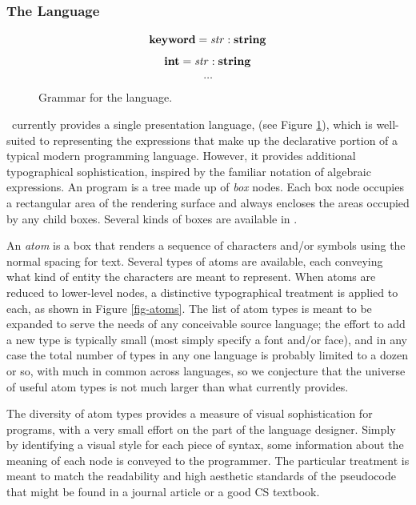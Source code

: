 
\subsubsection{The  Language}

\begin{figure}
$$\textbf{keyword} = \mathit{str} : \textbf{string}$$
$$\textbf{int} = \mathit{str} : \textbf{string}$$
$$\dots$$
\caption{\label{fig-expr} Grammar for the  language.}
\end{figure}

\Meta\ currently provides a single presentation language,  (see Figure \ref{fig-expr}), which is well-suited to representing the expressions that make up the declarative portion of a typical modern programming language. However, it provides additional typographical sophistication, inspired by the familiar notation of algebraic expressions. An  program is a tree made up of \emph{box} nodes. Each box node occupies a rectangular area of the rendering surface and always encloses the areas occupied by any child boxes. Several kinds of boxes are available in .

An \emph{atom} is a box that renders a sequence of characters and/or symbols using the normal spacing for text. Several types of atoms are available, each conveying what kind of entity the characters are meant to represent. When atoms are reduced to lower-level nodes, a distinctive typographical treatment is applied to each, as shown in Figure \ref{fig-atoms}. The list of atom types is meant to be expanded to serve the needs of any conceivable source language; the effort to add a new type is typically small (most simply specify a font and/or face), and in any case the total number of types in any one language is probably limited to a dozen or so, with much in common across languages, so we conjecture that the universe of useful atom types is not much larger than what  currently provides. 

The diversity of atom types provides a measure of visual sophistication for programs, with a very small effort on the part of the language designer. Simply by identifying a visual style for each piece of syntax, some information about the meaning of each node is conveyed to the programmer. The particular treatment is meant to match the readability and high aesthetic standards of the pseudocode that might be found in a journal article or a good CS textbook.

